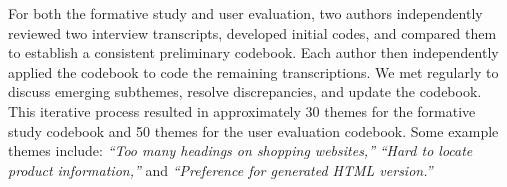 For both the formative study and user evaluation, two authors independently reviewed two interview transcripts, developed initial codes, and compared them to establish a consistent preliminary codebook. Each author then independently applied the codebook to code the remaining transcriptions. We met regularly to discuss emerging subthemes, resolve discrepancies, and update the codebook. This iterative process resulted in approximately 30 themes for the formative study codebook and 50 themes for the user evaluation codebook. Some example themes include: \textit{``Too many headings on shopping websites,''} \textit{``Hard to locate product information,''} and \textit{``Preference for generated HTML version.''}




